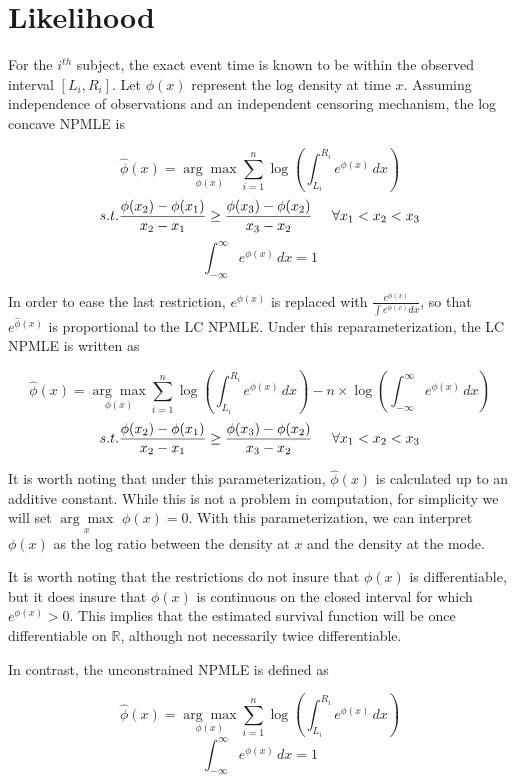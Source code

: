 \documentclass[10pt]{article}
\begin{document}
{\section {Likelihood}}

	For the $i^{th}$ subject, the exact event time is known to be within the observed interval $[L_i, R_i]$. Let $\phi(x)$ represent the log density at time $x$.  Assuming independence of observations and an independent censoring mechanism, the log concave NPMLE is 
	
	\[ \hat \phi(x) =\underset{\phi(x)} {\arg \max} \displaystyle \sum_{i = 1}^n \log \left( \int_{L_i}^{R_i} e^ { \phi(x) } \,dx \right)
	\]
	\[
	 s.t. \frac{ \phi(x_2) - \phi(x_1)} {x_2 - x_1} \geq \frac{ \phi(x_3) - \phi(x_2)} {x_3 - x_2} \hspace{0.5cm} \forall x_1 < x_2 < x_3 
	 \]
	 \[ \int_{-\infty}^{\infty} e^{\phi (x) } \,dx = 1
		\]

	In order to ease the last restriction, $e^{\phi(x)}$ is replaced with $\frac{e^{\phi(x)} } { \int  e^{\phi(x)} dx}$, so that $e^{\hat \phi(x)}$ is proportional to the LC NPMLE. Under this reparameterization, the LC NPMLE is written as 

	\[ \hat \phi(x) = \underset{\phi(x)} {\arg \max} \displaystyle \sum_{i = 1}^n \log \left( \int_{L_i}^{R_i} e^ { \phi(x) } \,dx \right) - n \times \log \left(  \int_{-\infty}^{\infty} e^ { \phi(x) } \,dx \right) 
	\]
	\[
	 s.t. \frac{ \phi(x_2) - \phi(x_1)} {x_2 - x_1} \geq \frac{ \phi(x_3) - \phi(x_2)} {x_3 - x_2}\hspace{0.5cm} \forall x_1 < x_2 < x_3 
	 \]
	
	It is worth noting that under this parameterization, $\hat \phi(x)$ is calculated up to an additive constant. While this is not a problem in computation, for simplicity we will set $\underset{x} {\arg \max}$ $\phi(x) = 0$. With this parameterization, we can interpret $\phi(x)$ as the log ratio between the density at $x$ and the density at the mode.

	It is worth noting that the restrictions do not insure that $\phi(x)$ is differentiable, but it does insure that $\phi(x)$ is continuous on the closed interval for which $e^{\phi(x)} > 0$. This implies that the estimated survival function will be once differentiable on $\mathbb{R}$, although not necessarily twice differentiable.
	
	In contrast, the unconstrained NPMLE is defined as 

	\[ \hat \phi(x) =\underset{\phi(x)} {\arg \max} \displaystyle \sum_{i = 1}^n \log \left( \int_{L_i}^{R_i} e^ { \phi(x) } \,dx \right)
	\]
	 \[ \int_{-\infty}^{\infty} e^{\phi (x) } \,dx = 1
		\]
	
\end{document}

